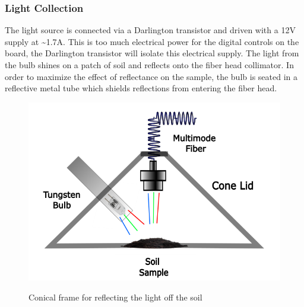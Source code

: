 \documentclass[journal]{IEEEtran}
\begin{document}
\subsubsection{Light Collection}
The light source is connected via a Darlington transistor and driven with a 12V supply at \~{}1.7A. This is too much electrical power for the digital controls on the board, the Darlington transistor will isolate this electrical supply. The light from the bulb shines on a patch of soil and reflects onto the fiber head collimator. In order to maximize the effect of reflectance on the sample, the bulb is seated in a reflective metal tube which shields reflections from entering the fiber head.
\begin{figure}[H]
    \centering
    \includegraphics[width=\linewidth]{images/Light Collection.png}
    \label{fig:Light-Collection-Diagram}
    \caption{Conical frame for reflecting the light off the soil}
\end{figure}
\end{document}
